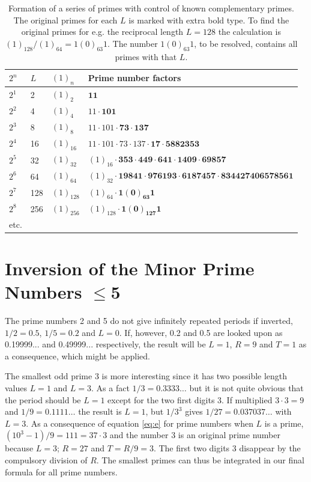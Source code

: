 \documentclass[10pt,twoside,a4paper]{amsart}
\begin{document}
\begin{table}[h!]
\begin{tabular}{l l l l}

$2^{n}$ & $L$ & $(1)_{n}$ & Prime number factors\\
\hline
$2^{1}$ & 2 & $(1)_{2}$ & $\mathbf{11}$\\
$2^{2}$ & 4 & $(1)_{4}$ & $11\cdot \mathbf{101}$\\
$2^{3}$ & 8 & $(1)_{8}$ & $11\cdot 101\cdot \mathbf{73} \cdot \mathbf{137}$\\
$2^{4}$ & 16 & $(1)_{16}$ & $11\cdot 101\cdot 73\cdot 137\cdot \mathbf{17}\cdot \mathbf{5882353}$\\
$2^{5}$ & 32 & $(1)_{32}$ & $(1)_{16}\cdot \mathbf{353}\cdot \mathbf{449}\cdot \mathbf{641}\cdot \mathbf{1409}\cdot \mathbf{69857}$\\
$2^{6}$ & 64 & $(1)_{64}$ & $(1)_{32}\cdot \mathbf{19841}\cdot \mathbf{976193}\cdot \mathbf{6187457} \cdot \mathbf{834427406578561}$\\
$2^{7}$ & 128 & $(1)_{128}$ & $(1)_{64}\cdot \mathbf{1(0)_{63}1}$\\
$2^{8}$ & 256 & $(1)_{256}$ & $(1)_{128}\cdot \mathbf{1(0)_{127}1}$\\
etc. & & & 
\end{tabular}
\caption{Formation of a series of primes with control of known complementary primes. The original primes for each $L$ is marked with extra bold type. To find the original primes for e.g. the reciprocal length $L = 128$ the calculation is $(1)_{128} /(1)_{64} = 1(0)_{63}1$. The number $1(0)_{63}1$, to be resolved, contains all primes with that $L$.}
\label{table:2n}
\end{table}

\section{Inversion of the Minor Prime Numbers ${\leq}$5}

The prime numbers 2 and 5 do not give infinitely repeated periods if inverted, $1/2 = 0.5$, $1/5 = 0.2$ and $L=0$. If, however, 0.2 and 0.5 are looked upon as 0.19999... and 0.49999... respectively, the result will be $L = 1$, $R = 9$ and $T = 1$ as a consequence, which might be applied.

The smallest odd prime 3 is more interesting since it has two possible length values $L = 1$ and $L = 3$. As a fact $1/3 = 0.3333\ldots$ but it is not quite obvious that the period should be $L = 1$ except for the two first digits 3. If multiplied $3\cdot 3 = 9$ and $1/9 = 0.1111\ldots$ the result is $L = 1$, but $1/3^{3}$ gives $1/27 = 0.037037\ldots$ with $L = 3$. As a consequence of equation \ref{eq:e} for prime numbers when $L$ is a prime, $(10^{3}-1)/9 = 111 = 37 \cdot 3$ and the number 3 is an original prime number because $L = 3$; $R = 27$ and $T = R/9 = 3$. The first two digits 3 disappear by the compulsory division of $R$. The smallest primes can thus be integrated in our final formula for all prime numbers.
\end{document}
